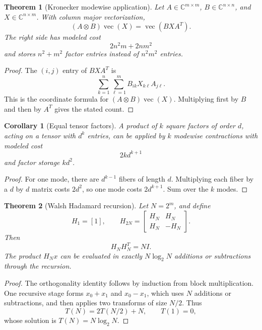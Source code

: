 \documentclass{aomart}
\newtheorem{theorem}{Theorem}[section]
\newtheorem{corollary}[corollary]{Corollary}
\theoremstyle{definition}
\theoremstyle{remark}
\newcommand{\CC}{\mathbb C}
\begin{document}
\begin{theorem}[Kronecker modewise application]\label{thm:kronecker_apply}
Let \(A\in\CC^{m\times m}\), \(B\in\CC^{n\times n}\), and \(X\in\CC^{n\times m}\). With column major vectorization,
\[
\boxed{
(A\otimes B)\operatorname{vec}(X)
=
\operatorname{vec}(BXA^T).
}
\]
The right side has modeled cost
\[
\boxed{
2n^2m+2nm^2
}
\]
and stores \(n^2+m^2\) factor entries instead of \(n^2m^2\) entries.
\end{theorem}

\begin{proof}
The \((i,j)\) entry of \(BXA^T\) is
\[
\sum_{k=1}^{n}\sum_{\ell=1}^{m}
B_{ik}X_{k\ell}A_{j\ell}.
\]
This is the coordinate formula for \((A\otimes B)\operatorname{vec}(X)\). Multiplying first by \(B\) and then by \(A^T\) gives the stated count.
\end{proof}

\begin{corollary}[Equal tensor factors]\label{cor:tensor_modewise}
A product of \(k\) square factors of order \(d\), acting on a tensor with \(d^k\) entries, can be applied by \(k\) modewise contractions with modeled cost
\[
\boxed{
2k d^{k+1}
}
\]
and factor storage \(kd^2\).
\end{corollary}

\begin{proof}
For one mode, there are \(d^{k-1}\) fibers of length \(d\). Multiplying each fiber by a \(d\) by \(d\) matrix costs \(2d^2\), so one mode costs \(2d^{k+1}\). Sum over the \(k\) modes.
\end{proof}

\begin{theorem}[Walsh Hadamard recursion]\label{thm:walsh_hadamard}
Let \(N=2^m\), and define
\[
H_1=[1],
\qquad
H_{2N}
=
\begin{bmatrix}
H_N&H_N\\
H_N&-H_N
\end{bmatrix}.
\]
Then
\[
H_NH_N^T=NI.
\]
The product \(H_Nx\) can be evaluated in exactly \(N\log_2N\) additions or subtractions through the recursion.
\end{theorem}

\begin{proof}
The orthogonality identity follows by induction from block multiplication. One recursive stage forms \(x_0+x_1\) and \(x_0-x_1\), which uses \(N\) additions or subtractions, and then applies two transforms of size \(N/2\). Thus
\[
T(N)=2T(N/2)+N,
\qquad
T(1)=0,
\]
whose solution is \(T(N)=N\log_2N\).
\end{proof}
\end{document}
